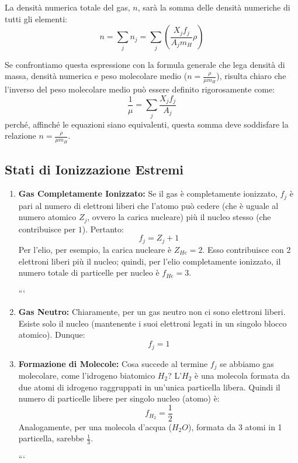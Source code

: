La densità numerica totale del gas, $n$, sarà la somma delle densità numeriche di tutti gli elementi:
\begin{equation}
n = \sum_j n_j = \sum_j \left( \frac{X_j f_j}{A_j m_H} \rho \right)
\end{equation}

Se confrontiamo questa espressione con la formula generale che lega densità di massa, densità numerica e peso molecolare medio ($n = \frac{\rho}{\mu m_H}$), risulta chiaro che l'inverso del peso molecolare medio può essere definito rigorosamente come:
\begin{equation}
\frac{1}{\mu} = \sum_j \frac{X_j f_j}{A_j}
\end{equation}
perché, affinché le equazioni siano equivalenti, questa somma deve soddisfare la relazione $n = \frac{\rho}{\mu m_H}$.

\subsection{Stati di Ionizzazione Estremi}

\begin{enumerate}
\item \textbf{Gas Completamente Ionizzato:}
Se il gas è completamente ionizzato, $f_j$ è pari al numero di elettroni liberi che l'atomo può cedere (che è uguale al numero atomico $Z_j$, ovvero la carica nucleare) più il nucleo stesso (che contribuisce per $1$). Pertanto:
\begin{equation}
f_j = Z_j + 1
\end{equation}
Per l'elio, per esempio, la carica nucleare è $Z_{He} = 2$. Esso contribuisce con 2 elettroni liberi più il nucleo; quindi, per l'elio completamente ionizzato, il numero totale di particelle per nucleo è $f_{He} = 3$.

```
\item \textbf{Gas Neutro:}
Chiaramente, per un gas neutro non ci sono elettroni liberi. Esiste solo il nucleo (mantenente i suoi elettroni legati in un singolo blocco atomico). Dunque:
\begin{equation}
    f_j = 1
\end{equation}

\item \textbf{Formazione di Molecole:}
Cosa succede al termine $f_j$ se abbiamo gas molecolare, come l'idrogeno biatomico $H_2$?
L'$H_2$ è una molecola formata da due atomi di idrogeno raggruppati in un'unica particella libera. Quindi il numero di particelle libere per singolo nucleo (atomo) è:
\begin{equation}
    f_{H_2} = \frac{1}{2}
\end{equation}
Analogamente, per una molecola d'acqua ($H_2O$), formata da 3 atomi in 1 particella, sarebbe $\frac{1}{3}$.

```

\end{enumerate}

